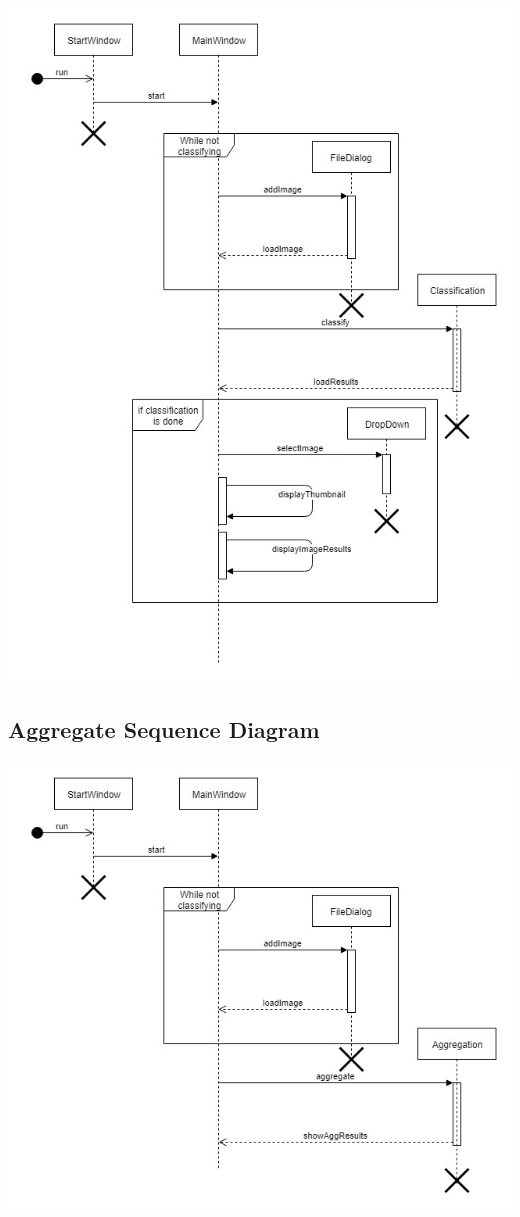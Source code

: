 \documentclass[parskip=full]{scrartcl}
\begin{document}
\begin{center}
\includegraphics[width=1.0\textwidth]{ViewResults.jpg}
\end{center}

\pagebreak

\subsection {Aggregate Sequence Diagram}

\begin{center}
\includegraphics[width=1.0\textwidth]{Aggregate.jpg}
\end{center}
\end{document}

